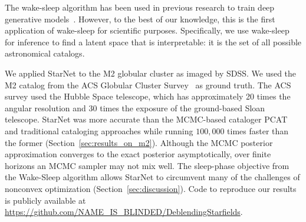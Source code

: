 The wake-sleep algorithm has been used in previous research to train deep generative models~\citep{Hinton1995wake_sleep, bornschein2014reweighted, le2020revisiting}.
However, to the best of our knowledge, this is the first application of wake-sleep for scientific purposes. 
Specifically, we use wake-sleep for inference to find a latent space that is interpretable: it is the set of all possible astronomical catalogs.


We applied StarNet to the M2 globular cluster as imaged by SDSS.
We used the M2 catalog from the ACS Globular Cluster Survey~\citep{Sarajedini_2007} as ground truth. 
The ACS survey used the Hubble Space telescope, 
which has approximately 20 times the angular resolution and 30 times the exposure of the ground-based Sloan telescope. 
StarNet was more accurate than the MCMC-based cataloger PCAT and traditional cataloging approaches while running $100,000$ times faster than the former (Section~\ref{sec:results_on_m2}).
Although the MCMC posterior approximation converges to the exact posterior asymptotically, over finite horizons an MCMC sampler may not mix well. The sleep-phase objective from the Wake-Sleep algorithm allows StarNet to circumvent many of the challenges of nonconvex optimization
(Section~\ref{sec:discussion}).
Code to reproduce our results is publicly available at 
\url{https://github.com/NAME_IS_BLINDED/DeblendingStarfields}. 


















